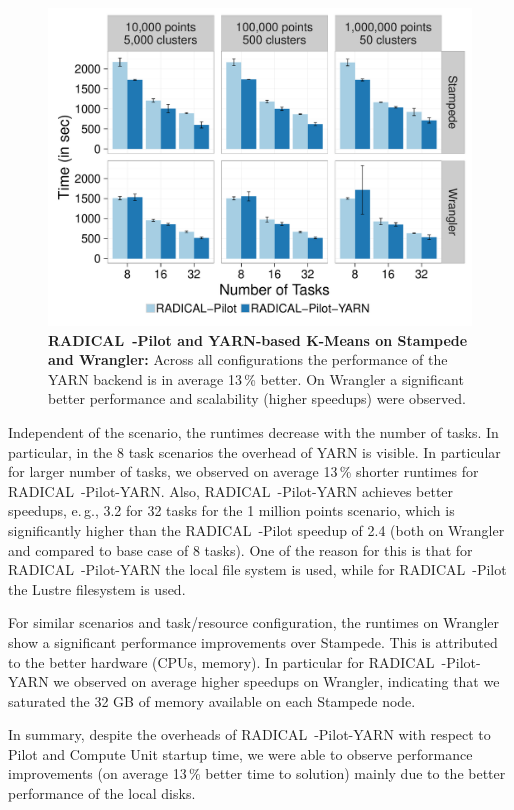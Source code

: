 \begin{figure}[t]
    \centering
    \includegraphics[width=.95\textwidth]{figures/data_analytics_hpc/hpc_hadoop/kmeans.pdf}
    \caption{\textbf{RADICAL~-Pilot and YARN-based K-Means on Stampede and Wrangler:}
        Across all configurations the performance of the YARN backend is in average 13\,\% better.
        On Wrangler a significant better performance and scalability (higher speedups) were observed.}
    \label{fig:experiments_kmeans_rpyarnkmeans}
\end{figure}

Independent of the scenario, the runtimes decrease with the number of tasks.
In particular, in the 8 task scenarios the overhead of YARN is visible.
In particular for larger number of tasks, we observed on average 13\,\% shorter runtimes for RADICAL~-Pilot-YARN.
Also, RADICAL~-Pilot-YARN achieves better speedups, e.\,g., 3.2 for 32 tasks for the 1 million points scenario, which is significantly higher than the RADICAL~-Pilot speedup of 2.4 (both on Wrangler and compared to base case of 8 tasks).
One of the reason for this is that for RADICAL~-Pilot-YARN the local file system is used, while for RADICAL~-Pilot the Lustre filesystem is used.

For similar scenarios and task/resource configuration, the runtimes on Wrangler show a significant performance improvements over Stampede.
This is attributed to the better hardware (CPUs, memory).
In particular for RADICAL~-Pilot-YARN we observed on average higher speedups on Wrangler, indicating that we saturated the 32 GB of memory available on each Stampede node.

In summary, despite the overheads of RADICAL~-Pilot-YARN with respect to Pilot and Compute Unit startup time, we were able to observe performance improvements (on average 13\,\% better time to solution) mainly due to the better performance of the local disks.
